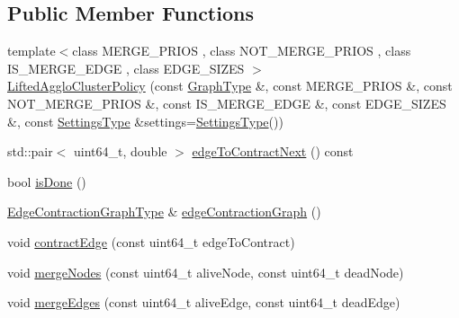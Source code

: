 \subsection*{Public Member Functions}
\begin{DoxyCompactItemize}
\item 
{\footnotesize template$<$class M\+E\+R\+G\+E\+\_\+\+P\+R\+I\+OS , class N\+O\+T\+\_\+\+M\+E\+R\+G\+E\+\_\+\+P\+R\+I\+OS , class I\+S\+\_\+\+M\+E\+R\+G\+E\+\_\+\+E\+D\+GE , class E\+D\+G\+E\+\_\+\+S\+I\+Z\+ES $>$ }\\\hyperlink{classnifty_1_1graph_1_1agglo_1_1LiftedAggloClusterPolicy_a6676fe1aac25a002816d1f951587ecd3}{Lifted\+Agglo\+Cluster\+Policy} (const \hyperlink{classnifty_1_1graph_1_1agglo_1_1LiftedAggloClusterPolicy_a727d681b2fa133b8c9b225ab11cd2402}{Graph\+Type} \&, const M\+E\+R\+G\+E\+\_\+\+P\+R\+I\+OS \&, const N\+O\+T\+\_\+\+M\+E\+R\+G\+E\+\_\+\+P\+R\+I\+OS \&, const I\+S\+\_\+\+M\+E\+R\+G\+E\+\_\+\+E\+D\+GE \&, const E\+D\+G\+E\+\_\+\+S\+I\+Z\+ES \&, const \hyperlink{structnifty_1_1graph_1_1agglo_1_1LiftedAggloClusterPolicy_1_1SettingsType}{Settings\+Type} \&settings=\hyperlink{structnifty_1_1graph_1_1agglo_1_1LiftedAggloClusterPolicy_1_1SettingsType}{Settings\+Type}())
\item 
std\+::pair$<$ uint64\+\_\+t, double $>$ \hyperlink{classnifty_1_1graph_1_1agglo_1_1LiftedAggloClusterPolicy_a7cf12b34af4a8de2b792a0f2042b2b70}{edge\+To\+Contract\+Next} () const
\item 
bool \hyperlink{classnifty_1_1graph_1_1agglo_1_1LiftedAggloClusterPolicy_a9ef227542d4e62bffa6f991ce64efe13}{is\+Done} ()
\item 
\hyperlink{classnifty_1_1graph_1_1agglo_1_1LiftedAggloClusterPolicy_a2fb57e57cf31de0f2d446cfd17d263a7}{Edge\+Contraction\+Graph\+Type} \& \hyperlink{classnifty_1_1graph_1_1agglo_1_1LiftedAggloClusterPolicy_aac8e5496a4e985d8fa093b9b903c86ce}{edge\+Contraction\+Graph} ()
\item 
void \hyperlink{classnifty_1_1graph_1_1agglo_1_1LiftedAggloClusterPolicy_a75a7a14461450bf423e77eb83b3a5f45}{contract\+Edge} (const uint64\+\_\+t edge\+To\+Contract)
\item 
void \hyperlink{classnifty_1_1graph_1_1agglo_1_1LiftedAggloClusterPolicy_a2bc3f45dc516b23baf9e240356fc2150}{merge\+Nodes} (const uint64\+\_\+t alive\+Node, const uint64\+\_\+t dead\+Node)
\item 
void \hyperlink{classnifty_1_1graph_1_1agglo_1_1LiftedAggloClusterPolicy_a606cf6cc2397a5e50ae7f9728d6cc727}{merge\+Edges} (const uint64\+\_\+t alive\+Edge, const uint64\+\_\+t dead\+Edge)

\end{DoxyCompactItemize}
